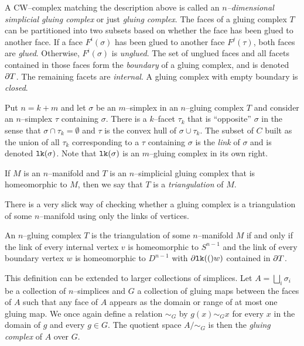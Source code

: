 \begin{defn}
  A CW--complex matching the description above is called an \emph{$n$--dimensional simplicial gluing complex} or just \emph{gluing complex}.
  The faces of a gluing complex $T$ can be partitioned into two subsets based on whether the face has been glued to another face.
  If a face $F^i(\sigma)$ has been glued to another face $F^j(\tau)$, both faces are \emph{glued}.
  Otherwise, $F^i(\sigma)$ is \emph{unglued}.
  The set of unglued faces and all facets contained in those faces form the \emph{boundary} of a gluing complex, and is denoted $\partial T$.
  The remaining facets are \emph{internal}.
  A gluing complex with empty boundary is \emph{closed}.

  Put $n=k+m$ and let $\sigma$ be an $m$--simplex in an $n$--gluing complex $T$ and consider an $n$--simplex $\tau$ containing $\sigma$.
  There is a $k$--facet $\tau_k$ that is ``opposite'' $\sigma$ in the sense that $\sigma\cap\tau_k=\emptyset$ and $\tau$ is the convex hull of $\sigma\cup\tau_k$.
  The subset of $C$ built as the union of all $\tau_k$ corresponding to a $\tau$ containing $\sigma$ is the \emph{link} of $\sigma$ and is denoted $\texttt{lk}(\sigma)$.
  Note that $\texttt{lk}(\sigma)$ is an $m$--gluing complex in its own right.

  If $M$ is an $n$--manifold and $T$ is an $n$--simplicial gluing complex that is homeomorphic to $M$, then we say that $T$ is a \emph{triangulation} of $M$.
\end{defn}

There is a very slick way of checking whether a gluing complex is a triangulation of some $n$--manifold using only the links of vertices.

\begin{theorem}
  An $n$--gluing complex $T$ is the triangulation of some $n$--manifold $M$ if and only if the link of every internal vertex $v$ is homeomorphic to $S^{n-1}$ and the link of every boundary vertex $w$ is homeomorphic to $D^{n-1}$ with $\partial\texttt{lk}(()w)$ contained in $\partial T$.
\end{theorem}
















This definition can be extended to larger collections of simplices.
Let $A=\bigsqcup_i\sigma_i$ be a collection of $n$--simplices and $G$ a collection of gluing maps between the faces of $A$ such that any face of $A$ appears as the domain or range of at most one gluing map.
We once again define a relation $\sim_G$ by $g(x)\sim_G x$ for every $x$ in the domain of $g$ and every $g\in G$. 
The quotient space $A/\sim_G$ is then the \emph{gluing complex} of $A$ over $G$.


